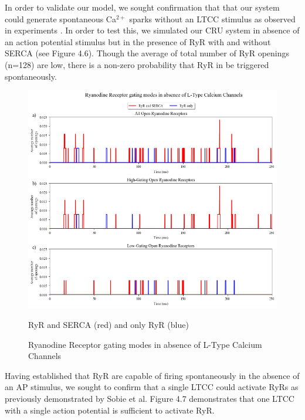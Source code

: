 \documentclass[12pt]{ucsddissertation}
\begin{document}
In order to validate our model, we sought confirmation that that our system could generate spontaneous Ca$^{2+}$ sparks without an LTCC stimulus as observed in experiments \cite{Cheng1993,Lopez-Lopez1994,Cannell1995}. In order to test this, we simulated our CRU system in absence of an action potential stimulus but in the presence of RyR with and without SERCA (see Figure 4.6). Though the average of total number of RyR openings (n=128) are low, there is a non-zero probability that RyR in be triggered spontaneously.

\setcounter{figure}{5}
\begin{figure}
\centering
	\includegraphics[scale=0.6]{buffer_fluo_RyR_r_Comparison.png}
	\caption{Ryanodine Receptor gating modes in absence of L-Type Calcium Channels} RyR and SERCA (red) and only RyR (blue)
\label{fig:Buffer RyR} 
\end{figure}

Having established that RyR are capable of firing spontaneously in the absence of an AP stimulus, we sought to confirm that a single LTCC could activate RyRs as previously demonstrated by Sobie et al\cite{Sobie2002}. Figure 4.7 demonstrates that one LTCC with a single action potential is sufficient to activate RyR. 
\end{document}
